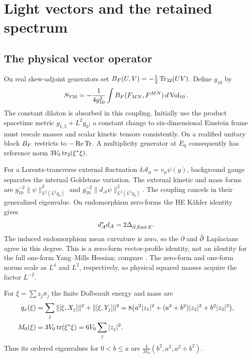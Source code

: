 \section{Light vectors and the retained spectrum}\label{sec:vectors}

\subsection{The physical vector operator}
On real skew-adjoint generators set
$B_F(U,V)=-\tfrac12\operatorname{Tr}_{32}(UV)$. Define $g_{10}$ by
\begin{equation}\label{eq:YMaction}
 S_{\rm YM}=-\frac1{4g_{10}^2}\int
    B_F(F_{MN},F^{MN})\,d\operatorname{Vol}_{10}.
\end{equation}
The constant dilaton is absorbed in this coupling. Initially use the
product spacetime metric $g_{1,5}+L^2g_0$; a constant change to
six-dimensional Einstein frame must rescale masses and scalar kinetic
tensors consistently. On a realified unitary block $B_F$ restricts to
$-\operatorname{Re}\operatorname{Tr}$. A multiplicity generator at $E_0$ consequently
has reference norm $3V_0\operatorname{tr}_2(\xi^*\xi)$.

For a Lorentz-transverse external fluctuation
$\delta\mathcal A_\mu=v_\mu\psi(y)$, background gauge separates the
internal Goldstone variation. The external kinetic and mass forms are
$g_{10}^{-2}\|\psi\|^2_{L^2(L^2g_0)}$ and
$g_{10}^{-2}\|d_{\mathcal A}\psi\|^2_{L^2(L^2g_0)}$.
The coupling cancels in their generalized eigenvalue. On endomorphism
zero-forms the HE K\"ahler identity gives
\begin{equation}\label{eq:physicaloperator}
 d_{\mathcal A}^*d_{\mathcal A}=2\Delta_{\bar\partial,\operatorname{End} E}.
\end{equation}
The induced endomorphism mean curvature is zero, so the $\partial$
and $\bar\partial$ Laplacians agree in this degree. This is a
zero-form vector-profile identity, not an identity for the full
one-form Yang--Mills Hessian; compare \cite[appendix~A]{louis}.
The zero-form and one-form norms scale as $L^4$ and $L^2$,
respectively, so physical squared masses acquire the factor $L^{-2}$.

For $\xi=\sum z_j\sigma_j$ the finite Dolbeault energy and mass are
\begin{align}
 q_x(\xi)&=\sum_j\|[\xi,X_j]\|^2+\|[\xi,Y_j]\|^2
 =8\bigl(a^2|z_1|^2+(a^2+b^2)|z_2|^2+b^2|z_3|^2\bigr),
 \label{eq:pauli-energy}\\
 M_0(\xi)&=3V_0\operatorname{tr}(\xi^*\xi)=6V_0\sum_j|z_j|^2.
 \label{eq:pauli-mass}
\end{align}
Thus its ordered eigenvalues for $0<b\le a$ are
$\tfrac4{3V_0}(b^2,a^2,a^2+b^2)$.


